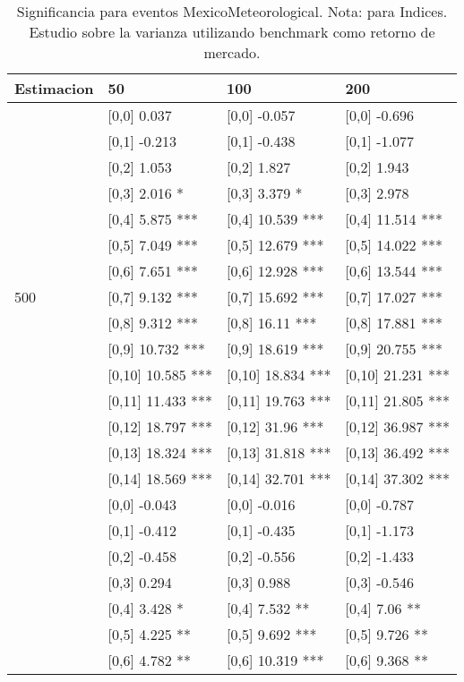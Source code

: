 \begin{table}

\caption{Significancia para eventos MexicoMeteorological. Nota: para Indices. Estudio sobre la varianza utilizando benchmark como retorno de mercado.}
\centering
\begin{tabular}[t]{llll}
\toprule
Estimacion & 50 & 100 & 200\\
\midrule
 & {}[0,0] 0.037 & {}[0,0] -0.057 & {}[0,0] -0.696\\
 & {}[0,1] -0.213 & {}[0,1] -0.438 & {}[0,1] -1.077\\
 & {}[0,2] 1.053 & {}[0,2] 1.827 & {}[0,2] 1.943\\
 & {}[0,3] 2.016 * & {}[0,3] 3.379 * & {}[0,3] 2.978\\
 & {}[0,4] 5.875 *** & {}[0,4] 10.539 *** & {}[0,4] 11.514 ***\\
\addlinespace
 & {}[0,5] 7.049 *** & {}[0,5] 12.679 *** & {}[0,5] 14.022 ***\\
 & {}[0,6] 7.651 *** & {}[0,6] 12.928 *** & {}[0,6] 13.544 ***\\
500 & {}[0,7] 9.132 *** & {}[0,7] 15.692 *** & {}[0,7] 17.027 ***\\
 & {}[0,8] 9.312 *** & {}[0,8] 16.11 *** & {}[0,8] 17.881 ***\\
 & {}[0,9] 10.732 *** & {}[0,9] 18.619 *** & {}[0,9] 20.755 ***\\
\addlinespace
 & {}[0,10] 10.585 *** & {}[0,10] 18.834 *** & {}[0,10] 21.231 ***\\
 & {}[0,11] 11.433 *** & {}[0,11] 19.763 *** & {}[0,11] 21.805 ***\\
 & {}[0,12] 18.797 *** & {}[0,12] 31.96 *** & {}[0,12] 36.987 ***\\
 & {}[0,13] 18.324 *** & {}[0,13] 31.818 *** & {}[0,13] 36.492 ***\\
 & {}[0,14] 18.569 *** & {}[0,14] 32.701 *** & {}[0,14] 37.302 ***\\
\addlinespace
 & {}[0,0] -0.043 & {}[0,0] -0.016 & {}[0,0] -0.787\\
 & {}[0,1] -0.412 & {}[0,1] -0.435 & {}[0,1] -1.173\\
 & {}[0,2] -0.458 & {}[0,2] -0.556 & {}[0,2] -1.433\\
 & {}[0,3] 0.294 & {}[0,3] 0.988 & {}[0,3] -0.546\\
 & {}[0,4] 3.428 * & {}[0,4] 7.532 ** & {}[0,4] 7.06 **\\
\addlinespace
 & {}[0,5] 4.225 ** & {}[0,5] 9.692 *** & {}[0,5] 9.726 **\\
 & {}[0,6] 4.782 ** & {}[0,6] 10.319 *** & {}[0,6] 9.368 **\\

\end{tabular}
\end{table}

